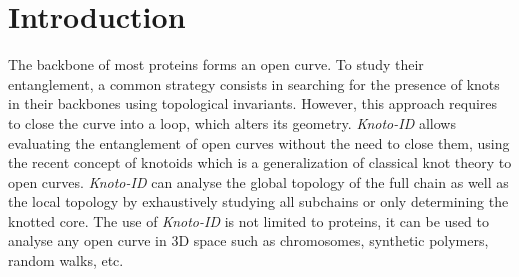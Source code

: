 \documentclass[a4paper,10pt]{article}
\begin{document}
\newpage


\section{Introduction}
The backbone of most proteins forms an open curve.  To study their
entanglement, a common strategy consists in searching for the presence
of knots in their backbones using topological invariants.  However,
this approach requires to close the curve into a loop, which alters
its geometry.  {\it Knoto-ID} allows evaluating the
entanglement of open curves without the need to close them, using the
recent concept of knotoids\cite{turaev,guka} which is a generalization
of classical knot theory to open curves.  {\it Knoto-ID} can analyse
the global topology of the full chain as well as the local topology by
exhaustively studying all subchains or only determining the knotted
core.  The use of {\it Knoto-ID} is not limited to proteins, it can be
used to analyse any open curve in 3D space such as chromosomes,
synthetic polymers, random walks, etc.
\end{document}
